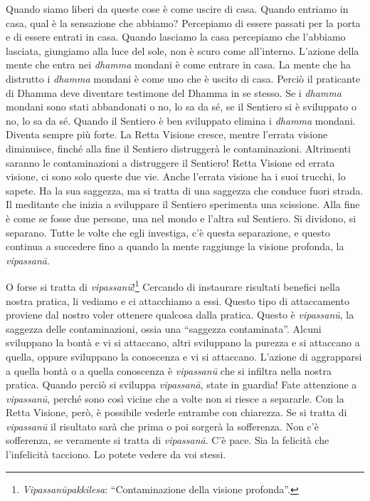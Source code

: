 Quando siamo liberi da queste cose è come uscire di casa. Quando
entriamo in casa, qual è la sensazione che abbiamo? Percepiamo di essere
passati per la porta e di essere entrati in casa. Quando lasciamo la
casa percepiamo che l'abbiamo lasciata, giungiamo alla luce del sole,
non è scuro come all'interno. L'azione della mente che entra nei
\emph{dhamma} mondani è come entrare in casa. La mente che ha distrutto
i \emph{dhamma} mondani è come uno che è uscito di casa. Perciò il
praticante di Dhamma deve diventare testimone del Dhamma in se stesso.
Se i \emph{dhamma} mondani sono stati abbandonati o no, lo sa da sé, se
il Sentiero si è sviluppato o no, lo sa da sé. Quando il Sentiero è ben
sviluppato elimina i \emph{dhamma} mondani. Diventa sempre più forte. La
Retta Visione cresce, mentre l'errata visione diminuisce, finché alla
fine il Sentiero distruggerà le contaminazioni. Altrimenti saranno le
contaminazioni a distruggere il Sentiero! Retta Visione ed errata
visione, ci sono solo queste due vie. Anche l'errata visione ha i suoi
trucchi, lo sapete. Ha la sua saggezza, ma si tratta di una saggezza che
conduce fuori strada. Il meditante che inizia a sviluppare il Sentiero
sperimenta una scissione. Alla fine è come se fosse due persone, una nel
mondo e l'altra sul Sentiero. Si dividono, si separano. Tutte le volte
che egli investiga, c'è questa separazione, e questo continua a
succedere fino a quando la mente raggiunge la visione profonda, la
\emph{vipassanā}.

O forse si tratta di \emph{vipassanū}!\footnote{\emph{Vipassanūpakkilesa}:
  ``Contaminazione della visione profonda''.} Cercando di instaurare
risultati benefici nella nostra pratica, li vediamo e ci attacchiamo a
essi. Questo tipo di attaccamento proviene dal nostro voler ottenere
qualcosa dalla pratica. Questo è \emph{vipassanū}, la saggezza delle
contaminazioni, ossia una ``saggezza contaminata''. Alcuni sviluppano la
bontà e vi si attaccano, altri sviluppano la purezza e si attaccano a
quella, oppure sviluppano la conoscenza e vi si attaccano. L'azione di
aggrapparsi a quella bontà o a quella conoscenza è \emph{vipassanū} che
si infiltra nella nostra pratica. Quando perciò si sviluppa
\emph{vipassanā}, state in guardia! Fate attenzione a \emph{vipassanū},
perché sono così vicine che a volte non si riesce a separarle. Con la
Retta Visione, però, è possibile vederle entrambe con chiarezza. Se si
tratta di \emph{vipassanū} il risultato sarà che prima o poi sorgerà la
sofferenza. Non c'è sofferenza, se veramente si tratta di
\emph{vipassanā}. C'è pace. Sia la felicità che l'infelicità tacciono.
Lo potete vedere da voi stessi.

